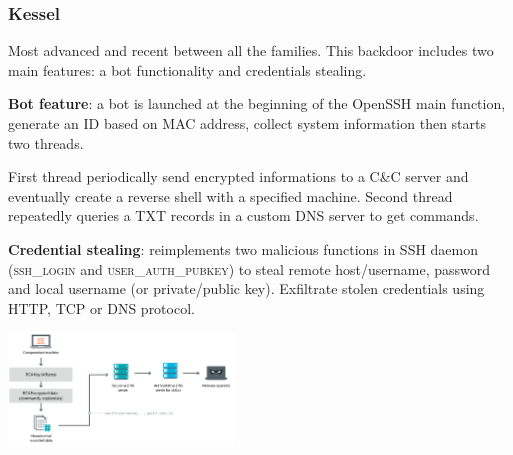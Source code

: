 \begin{frame}
	\frametitle{Kessel}
	
	\small
	
	Most advanced and recent between all the families. This backdoor includes two main features: a bot functionality and credentials stealing.
	
	\medskip
	
	\textbf{Bot feature}: a bot is launched at the beginning of the OpenSSH main function, generate an ID based on MAC address, collect system information then starts two threads.
  
	\smallskip

  First thread periodically send encrypted informations to a C\&C server and eventually create a reverse shell with a specified machine. Second thread repeatedly queries a TXT records in a custom DNS server to get commands.    
  
	\medskip
	
	\textbf{Credential stealing}: reimplements two malicious functions in SSH daemon (\textsc{ssh\_login} and \textsc{user\_auth\_pubkey}) to steal remote host/username, password and local username (or private/public key). Exfiltrate stolen credentials using HTTP, TCP or DNS protocol.
  
   \begin{center}    
   \includegraphics[width=0.45\textwidth]{images/dns_exfiltration}
   \end{center}

  	
\end{frame}


